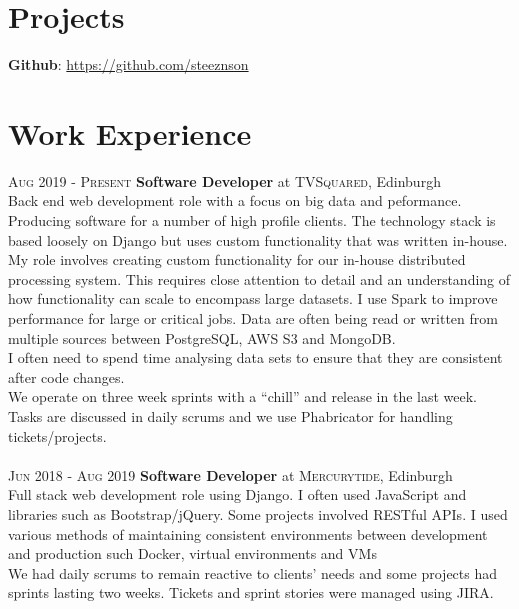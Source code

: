 \documentclass[14pt, a4paper]{extarticle}
\begin{document}
\begin{multicols}{2}
\section{Projects}
\noindent\textbf{Github}: \url{https://github.com/steeznson}

\columnbreak
\section{Work Experience}
\noindent\textsc{Aug 2019 - Present} \textbf{Software Developer}
at \textsc{TVSquared}, Edinburgh\\
Back end web development role with a focus on big data and peformance. Producing software for a number of high profile clients. The technology stack is based loosely on Django but uses custom functionality that was written in-house.\\ 
My role involves creating custom functionality for our in-house distributed processing system. This requires close attention to detail and an understanding of how functionality can scale to encompass large datasets. I use Spark to improve performance for large or critical jobs. Data are often being read or written from multiple sources between PostgreSQL, AWS S3 and MongoDB.\\
I often need to spend time analysing data sets to ensure that they are consistent after code changes.\\
We operate on three week sprints with a ``chill'' and release in the last week.  Tasks are discussed in daily scrums and we use Phabricator for handling tickets/projects.\\\\
\noindent\textsc{Jun 2018 - Aug 2019} \textbf{Software Developer}
at \textsc{Mercurytide}, Edinburgh\\
Full stack web development role using Django. I often used JavaScript and libraries such as Bootstrap/jQuery. Some projects involved RESTful APIs. I used various methods of maintaining consistent environments between development and production such Docker, virtual environments and VMs\\
We had daily scrums to remain reactive to clients' needs and some projects had sprints lasting two weeks. Tickets and sprint stories were managed using JIRA.\\
\end{multicols}
\end{document}
